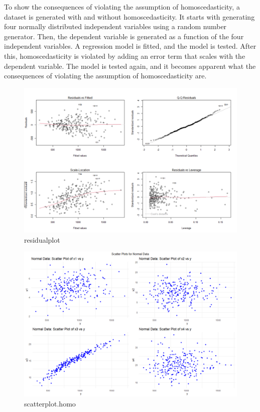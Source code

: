 To show the consequences of violating the assumption of homoscedasticity, a dataset is generated with and without homoscedasticity. It starts with generating four normally distributed independent variables using a random number generator. Then, the dependent variable is generated as a function of the four independent variables. A regression model is fitted, and the model is tested. After this, homoscedasticity is violated by adding an error term that scales with the dependent variable. The model is tested again, and it becomes apparent what the consequences of violating the assumption of homoscedasticity are.





\begin{figure}[h] 
	\centering\includegraphics[width=14cm]{billder/4.png}
	\caption{residualplot}
	\label{fig:j06}
\end{figure}

\begin{figure}[h] 
	\centering\includegraphics[width=14cm]{billder/5.png}
	\caption{scatterplot.homo}
	\label{fig:j06}
\end{figure}

